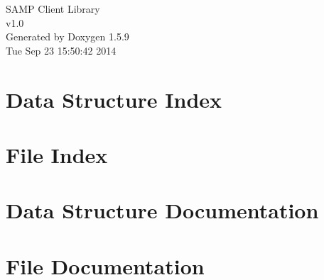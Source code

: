 \documentclass[letterpaper]{book}
\begin{document}
\hypersetup{pageanchor=false}
\begin{titlepage}
\vspace*{7cm}
\begin{center}
{\Large SAMP Client Library \\[1ex]\large v1.0 }\\
\vspace*{1cm}
{\large Generated by Doxygen 1.5.9}\\
\vspace*{0.5cm}
{\small Tue Sep 23 15:50:42 2014}\\
\end{center}
\end{titlepage}
\clearemptydoublepage
{}
\tableofcontents
\clearemptydoublepage
{}
\hypersetup{pageanchor=true}
\chapter{Data Structure Index}

\chapter{File Index}

\chapter{Data Structure Documentation}





\chapter{File Documentation}















\printindex
\end{document}

